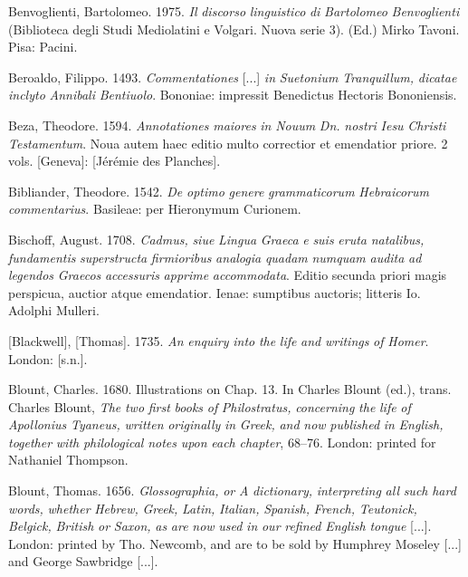 \documentclass[output=paper]{langsci/langscibook}
\begin{document}
Benvoglienti, Bartolomeo. 1975. \textit{Il} \textit{discorso} \textit{linguistico} \textit{di} \textit{Bartolomeo} \textit{Benvoglienti} (Biblioteca degli Studi Mediolatini e Volgari. Nuova serie 3). (Ed.) Mirko Tavoni. Pisa: Pacini.

Beroaldo, Filippo. 1493. \textit{Commentationes} [...] \textit{in} \textit{Suetonium} \textit{Tranquillum,} \textit{dicatae} \textit{inclyto} \textit{Annibali} \textit{Bentiuolo}. Bononiae: impressit Benedictus Hectoris Bononiensis.

Beza, Theodore. 1594. \textit{Annotationes} \textit{maiores} \textit{in} \textit{Nouum} \textit{Dn.} \textit{nostri} \textit{Iesu} \textit{Christi} \textit{Testamentum}. Noua autem haec editio multo correctior et emendatior priore. 2 vols. [Geneva]: [Jérémie des Planches].

Bibliander, Theodore. 1542. \textit{De} \textit{optimo} \textit{genere} \textit{grammaticorum} \textit{Hebraicorum} \textit{commentarius}. Basileae: per Hieronymum Curionem.

Bischoff, August. 1708. \textit{Cadmus,} \textit{siue} \textit{Lingua} \textit{Graeca} \textit{e} \textit{suis} \textit{eruta} \textit{natalibus,} \textit{fundamentis} \textit{superstructa} \textit{firmioribus} \textit{analogia} \textit{quadam} \textit{numquam} \textit{audita} \textit{ad} \textit{legendos} \textit{Graecos} \textit{accessuris} \textit{apprime} \textit{accommodata}. Editio secunda priori magis perspicua, auctior atque emendatior. Ienae: sumptibus auctoris; litteris Io. Adolphi Mulleri.

[Blackwell], [Thomas]. 1735. \textit{An} \textit{enquiry} \textit{into} \textit{the} \textit{life} \textit{and} \textit{writings} \textit{of} \textit{Homer}. London: [s.n.].

Blount, Charles. 1680. Illustrations on Chap. 13. In Charles Blount (ed.), trans. Charles Blount, \textit{The} \textit{two} \textit{first} \textit{books} \textit{of} \textit{Philostratus,} \textit{concerning} \textit{the} \textit{life} \textit{of} \textit{Apollonius} \textit{Tyaneus,} \textit{written} \textit{originally} \textit{in} \textit{Greek,} \textit{and} \textit{now} \textit{published} \textit{in} \textit{English,} \textit{together} \textit{with} \textit{philological} \textit{notes} \textit{upon} \textit{each} \textit{chapter}, 68–76. London: printed for Nathaniel Thompson.

Blount, Thomas. 1656. \textit{Glossographia,} \textit{or} \textit{A} \textit{dictionary,} \textit{interpreting} \textit{all} \textit{such} \textit{hard} \textit{words,} \textit{whether} \textit{Hebrew,} \textit{Greek,} \textit{Latin,} \textit{Italian,} \textit{Spanish,} \textit{French,} \textit{Teutonick,} \textit{Belgick,} \textit{British} \textit{or} \textit{Saxon,} \textit{as} \textit{are} \textit{now} \textit{used} \textit{in} \textit{our} \textit{refined} \textit{English} \textit{tongue} [...]. London: printed by Tho. Newcomb, and are to be sold by Humphrey Moseley [...] and George Sawbridge [...].
\end{document}
